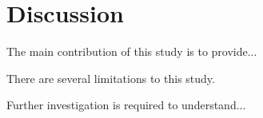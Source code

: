 \documentclass[12pt]{article}
\begin{document}
\section{Discussion}
\label{sec:disc}

The main contribution of this study is to provide... \lipsum[1]

There are several limitations to this study. \lipsum [1]

\lipsum[1]
Further investigation is required to understand... \lipsum[1]



\end{document}
